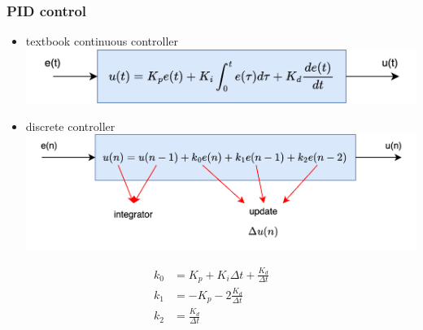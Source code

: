 \documentclass{beamer}
\begin{document}
\begin{frame}
  
  \frametitle{\textbf { PID control}}

  \begin{itemize}
    \item textbook continuous controller 
    {\centering \includegraphics[scale=0.6]{../diagrams/control_generic/control_generic-pid.png}}
    \item discrete controller 
    {\centering \includegraphics[scale=0.6]{../diagrams/control_generic/control_generic-pid_discrete.png}}
  \end{itemize}

  \begin{align*}
    k_0 &= K_p + K_i\Delta t + \frac{K_d}{\Delta t} \\
    k_1 &= -K_p - 2\frac{K_d}{\Delta t} \\
    k_2 &= \frac{K_d}{\Delta t}
  \end{align*}

\end{frame}
\end{document}
